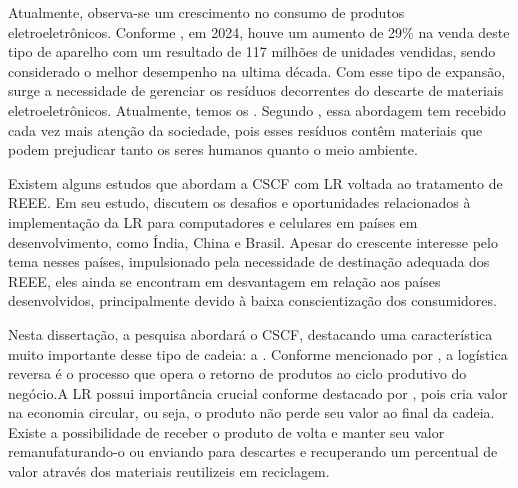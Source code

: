 Atualmente, observa-se um crescimento no consumo de produtos eletroeletrônicos. Conforme , em 2024, houve um aumento de 29\% na venda deste tipo de aparelho com um resultado de 117 milhões de unidades vendidas, sendo considerado o melhor desempenho na ultima década. Com esse tipo de expansão, surge a necessidade de gerenciar os resíduos decorrentes do descarte de materiais eletroeletrônicos. Atualmente, temos os . Segundo , essa abordagem tem recebido cada vez mais atenção da sociedade, pois esses resíduos contêm materiais que podem prejudicar tanto os seres humanos quanto o meio ambiente.

Existem alguns estudos que abordam a CSCF com LR voltada ao tratamento de REEE. Em seu estudo,  discutem os desafios e oportunidades relacionados à implementação da LR para computadores e celulares em países em desenvolvimento, como Índia, China e Brasil. Apesar do crescente interesse pelo tema nesses países, impulsionado pela necessidade de destinação adequada dos REEE, eles ainda se encontram em desvantagem em relação aos países desenvolvidos, principalmente devido à baixa conscientização dos consumidores.

Nesta dissertação, a pesquisa abordará o CSCF, destacando uma característica muito importante desse tipo de cadeia: a . Conforme mencionado por , a logística reversa é o processo que opera o retorno de produtos ao ciclo produtivo do negócio.A LR possui importância crucial conforme destacado por , pois cria valor na economia circular, ou seja, o produto não perde seu valor ao final da cadeia. Existe a possibilidade de receber o produto de volta e manter seu valor remanufaturando-o ou enviando para descartes e recuperando um percentual de valor através dos materiais reutilizeis em reciclagem.



